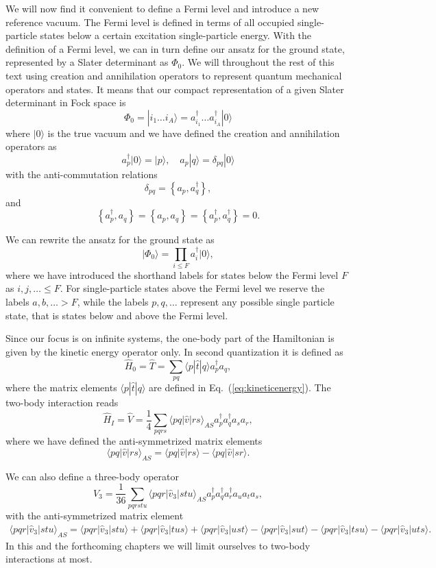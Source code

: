 We will now find it convenient to define a Fermi level and introduce a new reference vacuum. The Fermi level is defined in terms of all occupied single-particle states  below a certain excitation single-particle energy. 
With the definition of  a Fermi level, we can in turn define our ansatz for the ground state, represented by a Slater determinant
as $\Phi_0$.  We will throughout the rest of this text using creation and annihilation operators to represent quantum mechanical operators and states.
It means that our compact representation of a given Slater determinant in Fock space \cite{shavittbartlett2009} is
\[
  \Phi_{0}=|i_1 \dots i_A\rangle= a_{i_1}^{\dagger} \dots a_{i_A}^{\dagger} |0\rangle
\]
where $\vert 0\rangle$ is the true vacuum and we have defined the creation and annihilation operators as
    \[
        a_p^\dagger|0\rangle = |p\rangle, \quad a_p |q\rangle = \delta_{pq}|0\rangle
    \]
with the anti-commutation relations
\[
  \delta_{pq} = \left\{a_p, a_q^\dagger \right\},
\]
and 
\[
\left\{a_p^\dagger, a_q \right\} = \left\{a_p, a_q \right\} = \left\{a_p^\dagger, a_q^\dagger \right\}=0.
\]

We can rewrite the ansatz for the ground state as
\[
\vert\Phi_0\rangle = \prod_{i\le F}a_{i}^{\dagger} |0\rangle,
\]
where we have introduced the shorthand labels for states below the Fermi level $F$ as
$i,j,\ldots \leq F$. For single-particle states above the Fermi level we reserve the labels $a,b,\ldots > F$, while the labels $p,q, \ldots$
represent any possible single particle state, that is states below and above the Fermi level. 

Since our focus is on infinite systems, the one-body part of the Hamiltonian is given by the kinetic energy operator only.
In second quantization it is defined as
\[
\hat{H}_0=\hat{T} = \sum_{pq} \langle p|\hat{t}|q\rangle a_p^\dagger a_q,
\]
where the matrix elements $\langle p|\hat{t}|q\rangle$ are defined in Eq.~(\ref{eq:kineticenergy}). 
The two-body interaction  reads
\[
\hat{H}_I=\hat{V} = \frac{1}{4} \sum_{pqrs} \langle pq|\hat{v}|rs\rangle_{AS} a_p^\dagger a_q^\dagger a_s a_r,
\]
where we have defined the anti-symmetrized matrix elements
\[
\langle pq|\hat{v}|rs\rangle_{AS} = \langle pq|\hat{v}|rs\rangle - \langle pq|\hat{v}|sr\rangle.
\]

We can also define a three-body operator
\[
\hat{V}_3 = \frac{1}{36} \sum_{pqrstu} \langle pqr|\hat{v}_3|stu\rangle_{AS} 
                a_p^\dagger a_q^\dagger a_r^\dagger a_u a_t a_s,
\]
with the anti-symmetrized matrix element
\begin{align}
            \langle pqr|\hat{v}_3|stu\rangle_{AS} = \langle pqr|\hat{v}_3|stu\rangle + \langle pqr|\hat{v}_3|tus\rangle + \langle pqr|\hat{v}_3|ust\rangle- \langle pqr|\hat{v}_3|sut\rangle - \langle pqr|\hat{v}_3|tsu\rangle - \langle pqr|\hat{v}_3|uts\rangle.
\end{align}
In this and the forthcoming chapters we will limit ourselves to two-body interactions at most. 

